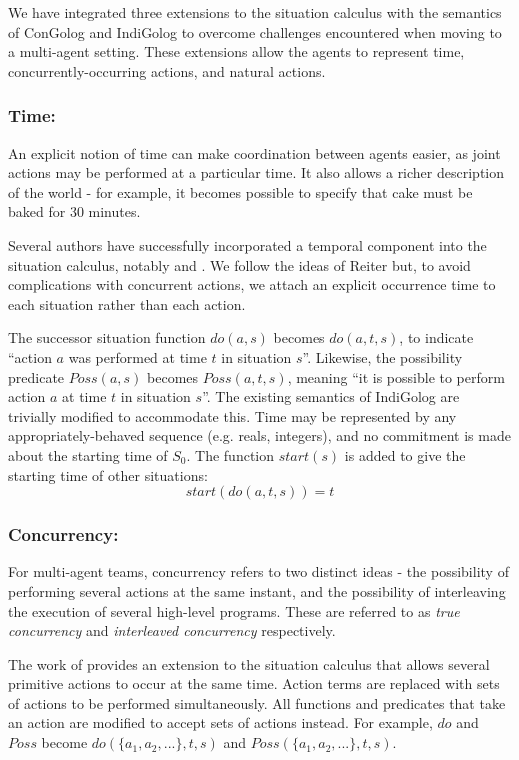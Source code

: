 \documentclass[letterpaper]{article}
\begin{document}
We have integrated three extensions to the situation calculus with the
semantics of ConGolog and IndiGolog to overcome
challenges encountered when moving to a multi-agent setting.  These
extensions allow the agents to represent time, concurrently-occurring actions,
and natural actions.

\subsubsection{Time:}
An explicit notion of time can make coordination between agents
easier, as joint actions may be performed at a particular time.  It
also allows a richer description of the world - for example, it becomes possible
to specify that cake must be baked for 30 minutes.

Several authors have successfully incorporated a temporal component
into the situation calculus, notably \cite{pinto94temporal} and
\cite{reiter96sc_nat_conc}.  We follow the ideas of Reiter but, to
avoid complications with concurrent actions, we attach an explicit 
occurrence time to each situation rather than each action.

The successor situation function $do(a,s)$
becomes $do(a,t,s)$, to indicate ``action $a$ was performed at
time $t$ in situation $s$''. Likewise, the possibility predicate
$Poss(a,s)$ becomes $Poss(a,t,s)$, meaning ``it is possible to
perform action $a$ at time $t$ in situation $s$''.  The existing semantics
of IndiGolog are trivially modified to accommodate this.
Time may be represented by any appropriately-behaved sequence (e.g. reals,
integers), and no commitment is made about the starting time of $S_0$.
The function $start(s)$ is added to give the starting time of other situations:
\begin{equation}
\label{eqn:sit_start}
start(do(a,t,s))=t
\end{equation}

\subsubsection{Concurrency:} 
For multi-agent teams, concurrency refers to two distinct ideas -
the possibility of performing several actions at the same instant,
and the possibility of interleaving the execution of several high-level
programs. These are referred to as \emph{true concurrency} and \emph{interleaved
concurrency} respectively.

The work of \cite{lin92sc_conc,reiter96sc_nat_conc} provides an extension
to the situation calculus that allows several primitive actions to
occur at the same time. Action terms are replaced with sets of actions
to be performed simultaneously. All functions and predicates that
take an action are modified to accept sets of actions instead. For
example, $do$ and $Poss$ become $do(\{ a_{1},a_{2},...\},t,s)$
and $Poss(\{ a_{1},a_{2},...\},t,s)$.
\end{document}

